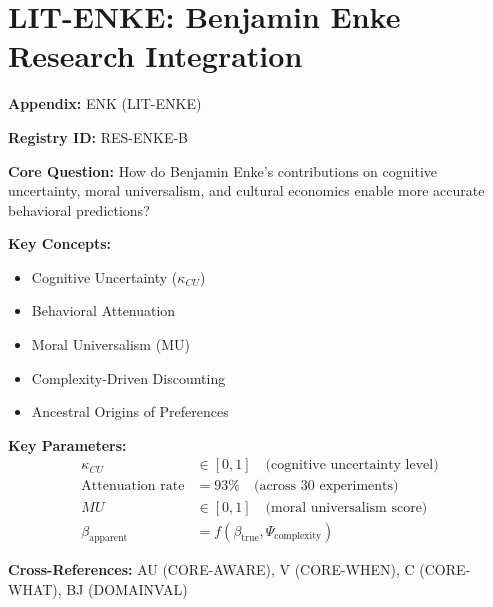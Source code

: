\chapter{LIT-ENKE: Benjamin Enke Research Integration}
\label{app:enk}


\begin{tcolorbox}[colback=blue!5!white, colframe=blue!75!black,
    title=Quick Reference: Appendix UNMAPPED_ENK]

\textbf{Appendix:} ENK (LIT-ENKE)

\textbf{Registry ID:} RES-ENKE-B

\textbf{Core Question:} How do Benjamin Enke's contributions on cognitive uncertainty,
moral universalism, and cultural economics enable more accurate behavioral predictions?

\textbf{Key Concepts:}
\begin{itemize}[nosep]
\item Cognitive Uncertainty ($\kappa_{CU}$)
\item Behavioral Attenuation
\item Moral Universalism (MU)
\item Complexity-Driven Discounting
\item Ancestral Origins of Preferences
\end{itemize}

\textbf{Key Parameters:}
\begin{align}
\kappa_{CU} &\in [0, 1] \quad \text{(cognitive uncertainty level)} \\
\text{Attenuation rate} &= 93\% \quad \text{(across 30 experiments)} \\
MU &\in [0, 1] \quad \text{(moral universalism score)} \\
\beta_{\text{apparent}} &= f(\beta_{\text{true}}, \Psi_{\text{complexity}})
\end{align}

\textbf{Cross-References:} AU (CORE-AWARE), V (CORE-WHEN), C (CORE-WHAT), BJ (DOMAINVAL)
\end{tcolorbox}


\begin{abstract}
This appendix documents the research contributions of Benjamin Enke
(Harvard University, h-index: 28) to behavioral and cultural economics
and their integration into the Evidence-Based Framework (EBF). Enke's work
is CENTRAL to EBF because it provides: (1) a formal theory of cognitive
uncertainty that explains anomalies across domains, (2) evidence that
hyperbolic discounting is a complexity artifact rather than a true preference,
(3) a new utility dimension (moral universalism) that explains political
ideology, and (4) cultural origins of preference heterogeneity. His research
fundamentally shapes EBF's AWARE, WHEN, WHAT, and WHO dimensions.
\end{abstract}


